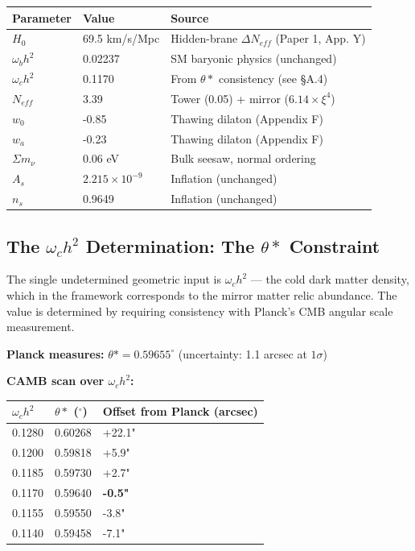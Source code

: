 \documentclass[aps,prd,preprint,superscriptaddress,longbibliography]{revtex4-2}
\begin{document}
\begin{table}[H]
\begin{ruledtabular}
\begin{tabular}{p{5.0cm}p{5.0cm}p{5.0cm}}
Parameter & Value & Source \\
\hline
$H_{0}$ & 69.5 km/s/Mpc & Hidden-brane $\Delta N_{eff}$ (Paper 1, App. Y) \\
$\omega_b h^{2}$ & 0.02237 & SM baryonic physics (unchanged) \\
$\omega_c h^{2}$ & 0.1170 & From $\theta*$ consistency (see \S{}A.4) \\
$N_{eff}$ & 3.39 & Tower (0.05) + mirror ($6.14\times\xi^{4}$) \\
$w_{0}$ & -0.85 & Thawing dilaton (Appendix F) \\
$w_a$ & -0.23 & Thawing dilaton (Appendix F) \\
$\Sigma m_\nu$ & 0.06 eV & Bulk seesaw, normal ordering \\
$A_s$ & $2.215\times10^{-9}$ & Inflation (unchanged) \\
$n_s$ & 0.9649 & Inflation (unchanged) \\
\end{tabular}
\end{ruledtabular}
\end{table}



\subsection{The $\omega_c h^{2}$ Determination: The $\theta*$ Constraint}

The single undetermined geometric input is $\omega_c h^{2}$ --- the cold dark matter density, which in the framework corresponds to the mirror matter relic abundance. The value is determined by requiring consistency with Planck's CMB angular scale measurement.

\textbf{Planck measures:} $\theta* = 0.59655^{\circ}$ (uncertainty: 1.1 arcsec at $1\sigma$)

\textbf{CAMB scan over $\omega_c h^{2}$:}


\begin{table}[H]
\begin{ruledtabular}
\begin{tabular}{p{5.0cm}p{5.0cm}p{5.0cm}}
$\omega_c h^{2}$ & $\theta*$ ($^{\circ}$) & Offset from Planck (arcsec) \\
\hline
0.1280 & 0.60268 & +22.1" \\
0.1200 & 0.59818 & +5.9" \\
0.1185 & 0.59730 & +2.7" \\
0.1170 & 0.59640 & \textbf{-0.5"} \\
0.1155 & 0.59550 & -3.8" \\
0.1140 & 0.59458 & -7.1" \\
\end{tabular}
\end{ruledtabular}
\end{table}
\end{document}
